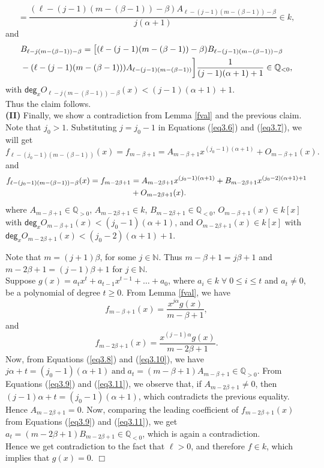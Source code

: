 \documentclass[12pt,reqno]{amsart}
\renewcommand{\deg}{\mathsf{deg}}
\renewcommand{\leq}{\leqslant}
\renewcommand{\geq}{\geqslant}
\numberwithin{thm}{section}
\theoremstyle{definition}
\numberwithin{equation}{thm}
\renewenvironment{proof}{\par\noindent {\em Proof:}}{\hfill$\Box$\medskip}
\theoremstyle{plain}
\begin{document}
\begin{proof}
\[=\frac{(\ell-(j-1)(m-(\beta-1))-\beta)A_{\ell-(j-1)(m-(\beta-1))-\beta}}{j(\alpha+1)}\in k,
\]
and
\begin{align}
&B_{\ell-j(m-(\beta-1))-\beta}=\big[
(\ell-(j-1)(m-(\beta-1))-\beta)B_{\ell-(j-1)(m-(\beta-1))-\beta}\notag \\
&-(\ell-(j-1)(m-(\beta-1)))A_{\ell-(j-1)(m-(\beta-1))}\bigg]\frac{1}{(j-1)(\alpha+1)+1}
\in\mathbb{Q}_{<0},\notag
\end{align}
with $\deg_x O_{\ell-j(m-(\beta-1))-\beta}(x)<(j-1)(\alpha+1)+1$.\\ 
Thus the claim follows.\\ 
\textbf{(II)} Finally, we show a contradiction from Lemma \ref{fval} and the previous claim.\\
Note that $j_0>1$. Substituting $j=j_0-1$ in Equations (\ref{eq3.6}) and (\ref{eq3.7}), we will get 
\begin{equation}\label{eq3.8}
f_{\ell-(j_0-1)(m-(\beta-1))}(x)=f_{m-\beta+1}
= A_{m-\beta+1}x^{(j_0-1)(\alpha+1)}+O_{m-\beta+1}(x).
\end{equation}
and
\begin{align}\label{eq3.9}
f_{\ell-(j_0-1)(m-(\beta-1))-\beta}(x)=f_{m-2\beta+1}
&= A_{m-2\beta+1}x^{(j_0-1)(\alpha+1)}
+ B_{m-2\beta+1}x^{(j_0-2)(\alpha+1)+1}
\notag\\
&+ O_{m-2\beta+1}(x).
\end{align}
where $A_{m-\beta+1}\in\mathbb{Q}_{>0}$, $A_{m-2\beta+1}\in k$, $B_{m-2\beta+1}\in\mathbb{Q}_{<0}$,
$O_{m-\beta+1}(x)\in k[x]$ with $\deg_x O_{m-\beta+1}(x)<(j_0-1)(\alpha+1)$, and $O_{m-2\beta+1}(x)\in k[x]$ with $\deg_x O_{m-2\beta+1}(x)<(j_0-2)(\alpha+1)+1$.

\medskip

\noindent Note that $m=(j+1)\beta$, for some $j\in \mathbb{N}$. Thus $m-\beta+1=j\beta+1$ and $m-2\beta+1=(j-1)\beta+1$ for $j\in \mathbb{N}$. \\
Suppose $g(x)=a_tx^t+a_{t-1}x^{t-1}+\dots+a_0$, where $a_i\in k\; \forall\; 0\leq i \leq t$ and $a_t\ne0$, be a polynomial of degree $t\geq0$.  
From Lemma \ref{fval}, we have
\begin{equation}\label{eq3.10}
f_{m-\beta+1}(x)=
\frac{x^{j\alpha} g(x)}{m-\beta+1},
\end{equation}
and
\begin{equation}\label{eq3.11}
f_{m-2\beta+1}(x)=
\frac{x^{(j-1)\alpha}g(x)}{m-2\beta+1}.
\end{equation}
Now, from Equations (\ref{eq3.8}) and (\ref{eq3.10}), we have 
$j\alpha+t=(j_0-1)(\alpha+1)\;\text{and}\; a_t=(m-\beta+1)A_{m-\beta+1}\in\mathbb{Q}_{>0}$. From Equations (\ref{eq3.9}) and (\ref{eq3.11}), we observe that, if  $A_{m-2\beta+1}\ne0$, then $(j-1)\alpha+t=(j_0-1)(\alpha+1)$, which contradicts the previous equality. Hence $A_{m-2\beta+1}=0$. Now, comparing the leading coefficient of $f_{m-2\beta+1}(x)$ from Equations (\ref{eq3.9}) and (\ref{eq3.11}), we get $a_t=(m-2\beta+1)B_{m-2\beta+1}\in\mathbb{Q}_{<0}$, which is again a contradiction.\\
Hence we get contradiction to the fact that $\ell>0$, and therefore $f\in k $, which implies that $g(x)=0$.
\end{proof}
\end{document}
